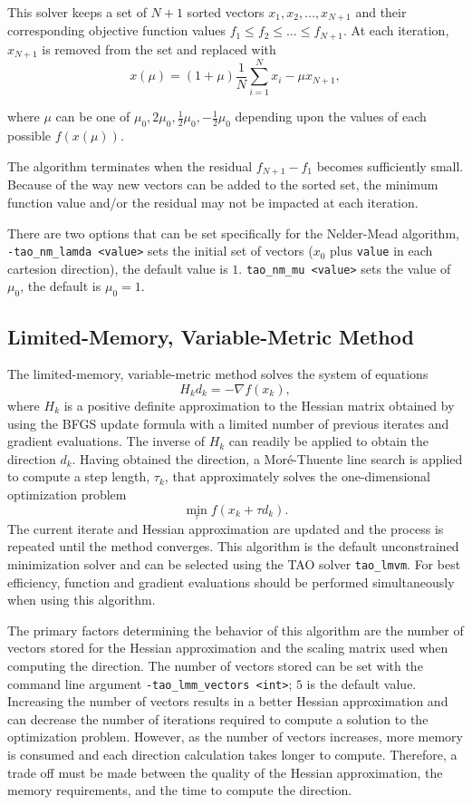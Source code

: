 This solver keeps a set of $N+1$ sorted vectors ${x_1,x_2,\ldots,x_{N+1}}$ and their corresponding 
objective function values $f_1 \leq f_2 \leq \ldots \leq f_{N+1}$.  At each iteration, $x_{N+1}$ is removed from
the set and replaced with 
\[
x(\mu) = (1+\mu) \frac{1}{N} \sum_{i=1}^N x_i - \mu x_{N+1},
\]  
 
where $\mu$ can be one of ${\mu_0,2\mu_0,\frac{1}{2}\mu_0,-\frac{1}{2}\mu_0}$ depending upon the values of 
each possible $f(x(\mu))$.

The algorithm terminates when the residual  $f_{N+1} - f_1$ becomes sufficiently small.  Because of 
the way new vectors can be added to the sorted set, 
the minimum function value and/or the residual may not be impacted at each iteration.

There are two options that can be set specifically for the Nelder-Mead algorithm,
{\tt -tao\_nm\_lamda <value>} sets the initial set of vectors ($x_0$ plus 
{\tt value} in each cartesion direction), the default value is $1$.  
{\tt tao\_nm\_mu <value>} sets the value of $\mu_0$, 
the default is $\mu_0=1$.


\subsection{Limited-Memory, Variable-Metric Method}

The limited-memory, variable-metric method solves the system of equations
\[
H_k d_k = -\nabla f(x_k),
\]
where $H_k$ is a positive definite approximation to the Hessian matrix 
obtained by using the BFGS update formula with a limited number of 
previous iterates and gradient evaluations.  The inverse of $H_k$ can 
readily be applied to obtain the direction $d_k$.  Having obtained the 
direction, a Mor\'{e}-Thuente line search is applied to compute a step
length, $\tau_k$, that approximately solves the one-dimensional 
optimization problem
\[
\min_\tau f(x_k + \tau d_k).
\]
The current iterate and Hessian approximation are updated and the process
is repeated until the method converges.  This algorithm is the default 
unconstrained minimization solver and can be selected using the 
TAO solver {\tt tao\_lmvm}.  For best efficiency, function and gradient 
evaluations should be performed simultaneously when using this algorithm.

The primary factors determining the behavior of this algorithm are the 
number of vectors stored for the Hessian approximation and the scaling matrix
used when computing the direction.  The number of vectors stored can be set
with the command line argument {\tt -tao\_lmm\_vectors <int>}; $5$ is the 
default 
value.  Increasing the number of vectors results in a better Hessian 
approximation and can decrease the number of iterations required to compute
a solution to the optimization problem.  However, as the number of vectors
increases, more memory is consumed and each direction calculation takes
longer to compute.  Therefore, a trade off must be made between the 
quality of the Hessian approximation, the memory requirements, and
the time to compute the direction.

